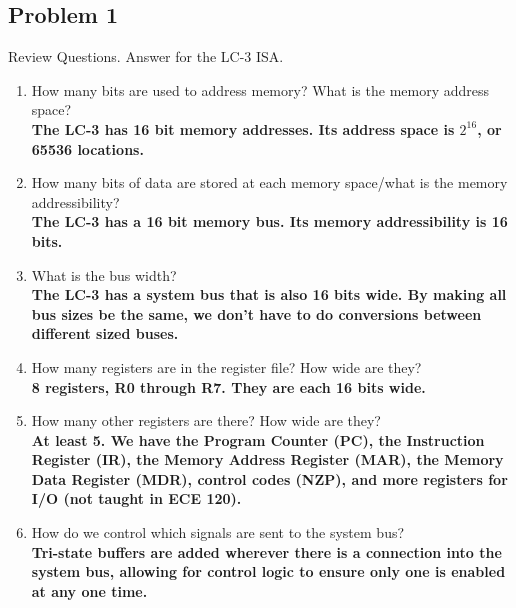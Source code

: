 \documentclass{article}
\begin{document}
\subsection*{Problem 1}
Review Questions. Answer for the LC-3 ISA.
\begin{enumerate}[label=\alph*.]
\item How many bits are used to address memory? What is the memory address space? \\
\textbf{The LC-3 has 16 bit memory addresses. Its address space is $2^{16}$, or 65536 locations.}
\item How many bits of data are stored at each memory space/what is the memory addressibility? \\
\textbf{The LC-3 has a 16 bit memory bus. Its memory addressibility is 16 bits. }
\item What is the bus width? \\
\textbf{The LC-3 has a system bus that is also 16 bits wide. By making all bus sizes be the same, we don't have to do conversions between different sized buses.}
\item How many registers are in the register file? How wide are they? \\
\textbf{8 registers, R0 through R7. They are each 16 bits wide.}
\item How many other registers are there? How wide are they? \\
\textbf{At least 5. We have the Program Counter (PC), the Instruction Register (IR), the Memory Address Register (MAR), the Memory Data Register (MDR), control codes (NZP), and more registers for I/O (not taught in ECE 120).}
\item How do we control which signals are sent to the system bus? \\
\textbf{Tri-state buffers are added wherever there is a connection into the system bus, allowing for control logic to ensure only one is enabled at any one time.}
\end{enumerate}
\end{document}
